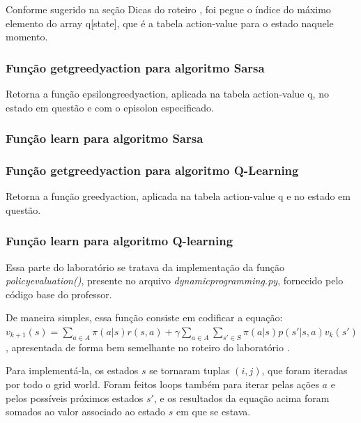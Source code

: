 \documentclass[conference]{IEEEtran}
\begin{document}
Conforme sugerido na seção Dicas do roteiro \cite{roteiro}, foi pegue o índice do máximo elemento do array q[state], que é a tabela action-value para o estado naquele momento.

\subsubsection{Função get\underline{\space}greedy\underline{\space}action para algoritmo Sarsa}

Retorna a função epsilon\underline{\space}greedy\underline{\space}action, aplicada na tabela action-value q, no estado em questão e com o episolon especificado.

\subsubsection{Função learn para algoritmo Sarsa}

\subsubsection{Função get\underline{\space}greedy\underline{\space}action para algoritmo Q-Learning}

Retorna a função greedy\underline{\space}action, aplicada na tabela action-value q e no estado em questão.

\subsubsection{Função learn para algoritmo Q-learning}

Essa parte do laboratório se tratava da implementação da função \textit{policy\underline{\space}evaluation()}, presente no arquivo \textit{dynamic\underline{\space}programming.py}, fornecido pelo código base do professor. 

De maneira simples, essa função consiste em codificar a equação: $v_{k+1}\left ( s \right ) = \sum_{a\in A} \pi \left ( a|s \right ) r \left ( s, a \right ) + \gamma \sum_{a\in A} \sum_{s'\in S} \pi \left ( a|s \right ) p \left ( s' | s, a \right ) v_k \left ( s' \right )$, apresentada de forma bem semelhante no roteiro do laboratório \cite{roteiro}.

Para implementá-la, os estados $s$ se tornaram tuplas $(i, j)$, que foram iteradas por todo o grid world. Foram feitos loops também para iterar pelas ações $a$ e pelos possíveis próximos estados $s'$, e os resultados da equação acima foram somados ao valor associado ao estado $s$ em que se estava. 
\end{document}
